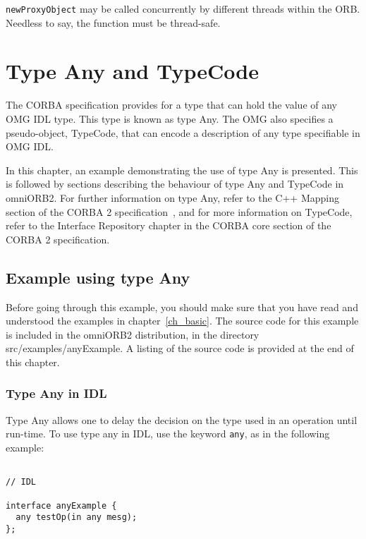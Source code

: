 \documentclass[11pt,twoside,onecolumn]{book}
\begin{document}
{\tt newProxyObject} may be called concurrently by different threads within
the ORB. Needless to say, the function must be thread-safe.


\chapter{Type Any and TypeCode}
\label{ch_any}

The CORBA specification provides for a type that can hold the value of any 
OMG IDL type. This type is known as type Any. The OMG also specifies a 
pseudo-object, TypeCode, that can encode a description of any type specifiable
in OMG IDL.

In this chapter, an example demonstrating the use of type Any is presented. 
This is followed by sections describing the behaviour of type Any and TypeCode 
in omniORB2. 
For further information on type Any, refer to the C++ Mapping section of the 
CORBA 2 specification~\cite{corba2-spec}, and for more information on 
TypeCode, refer to the Interface Repository chapter in the CORBA core section 
of the CORBA 2 specification. 

\section{Example using type Any}

Before going through this example, you should make sure that you have read 
and understood the examples in chapter~\ref{ch_basic}.
The source code for this example is included in the omniORB2 distribution,
in the directory src/examples/anyExample. A listing of the source code is
provided at the end of this chapter.

\subsection{Type Any in IDL}
Type Any allows one to delay the decision on the type used in an operation 
until run-time. To use type any in IDL, use the keyword {\tt any}, as in the 
following example:
{\small
\begin{verbatim}

// IDL

interface anyExample {
  any testOp(in any mesg);
};

\end{verbatim}
}
\end{document}

